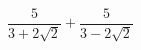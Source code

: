 \begin{ex}[type=calculate]
	\begin{condition}
		\( \dfrac{5}{3+2\sqrt{2}}+\dfrac{5}{3-2\sqrt{2}} \)
	\end{condition}
\end{ex}